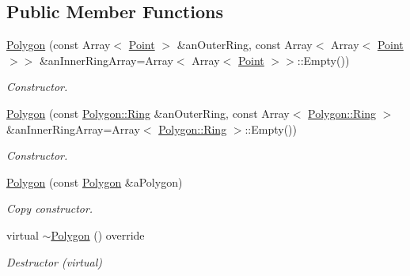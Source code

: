 \subsection*{Public Member Functions}
\begin{DoxyCompactItemize}
\item 
\hyperlink{classostk_1_1math_1_1geom_1_1d2_1_1objects_1_1_polygon_adaf9ef564754ab10ed3dd0d5fa0d90ea}{Polygon} (const Array$<$ \hyperlink{classostk_1_1math_1_1geom_1_1d2_1_1objects_1_1_point}{Point} $>$ \&an\+Outer\+Ring, const Array$<$ Array$<$ \hyperlink{classostk_1_1math_1_1geom_1_1d2_1_1objects_1_1_point}{Point} $>$$>$ \&an\+Inner\+Ring\+Array=Array$<$ Array$<$ \hyperlink{classostk_1_1math_1_1geom_1_1d2_1_1objects_1_1_point}{Point} $>$$>$\+::Empty())
\begin{DoxyCompactList}\small\item\em Constructor. \end{DoxyCompactList}\item 
\hyperlink{classostk_1_1math_1_1geom_1_1d2_1_1objects_1_1_polygon_adebeb4b256cd7f772f62934c06431d27}{Polygon} (const \hyperlink{classostk_1_1math_1_1geom_1_1d2_1_1objects_1_1_polygon_a2cfc117e0bd669946a670640eae4ee4c}{Polygon\+::\+Ring} \&an\+Outer\+Ring, const Array$<$ \hyperlink{classostk_1_1math_1_1geom_1_1d2_1_1objects_1_1_polygon_a2cfc117e0bd669946a670640eae4ee4c}{Polygon\+::\+Ring} $>$ \&an\+Inner\+Ring\+Array=Array$<$ \hyperlink{classostk_1_1math_1_1geom_1_1d2_1_1objects_1_1_polygon_a2cfc117e0bd669946a670640eae4ee4c}{Polygon\+::\+Ring} $>$\+::Empty())
\begin{DoxyCompactList}\small\item\em Constructor. \end{DoxyCompactList}\item 
\hyperlink{classostk_1_1math_1_1geom_1_1d2_1_1objects_1_1_polygon_a191a97760bb334ede4b4181350d7b526}{Polygon} (const \hyperlink{classostk_1_1math_1_1geom_1_1d2_1_1objects_1_1_polygon}{Polygon} \&a\+Polygon)
\begin{DoxyCompactList}\small\item\em Copy constructor. \end{DoxyCompactList}\item 
virtual \hyperlink{classostk_1_1math_1_1geom_1_1d2_1_1objects_1_1_polygon_a26cd1c315770832bcb10c7c78f473ac1}{$\sim$\+Polygon} () override
\begin{DoxyCompactList}\small\item\em Destructor (virtual) \end{DoxyCompactList}\item 

\end{DoxyCompactItemize}
